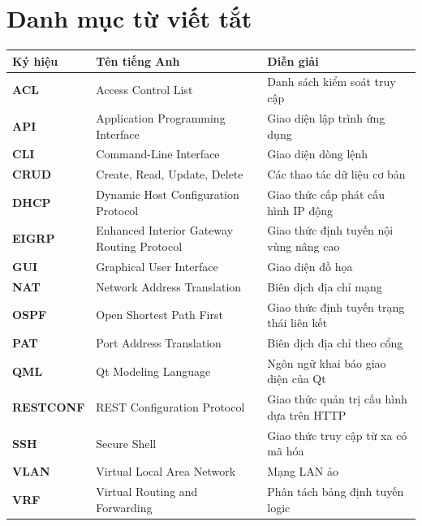 \chapter*{Danh mục từ viết tắt}

\begin{longtable}{>{\bfseries}p{}p{}p{}}
\toprule
Ký hiệu & Tên tiếng Anh & Diễn giải \\
\midrule
ACL & Access Control List & Danh sách kiểm soát truy cập \\
API & Application Programming Interface & Giao diện lập trình ứng dụng \\
CLI & Command-Line Interface & Giao diện dòng lệnh \\
CRUD & Create, Read, Update, Delete & Các thao tác dữ liệu cơ bản \\
DHCP & Dynamic Host Configuration Protocol & Giao thức cấp phát cấu hình IP động \\
EIGRP & Enhanced Interior Gateway Routing Protocol & Giao thức định tuyến nội vùng nâng cao \\
GUI & Graphical User Interface & Giao diện đồ họa \\
NAT & Network Address Translation & Biên dịch địa chỉ mạng \\
OSPF & Open Shortest Path First & Giao thức định tuyến trạng thái liên kết \\
PAT & Port Address Translation & Biên dịch địa chỉ theo cổng \\
QML & Qt Modeling Language & Ngôn ngữ khai báo giao diện của Qt \\
RESTCONF & REST Configuration Protocol & Giao thức quản trị cấu hình dựa trên HTTP \\
SSH & Secure Shell & Giao thức truy cập từ xa có mã hóa \\
VLAN & Virtual Local Area Network & Mạng LAN ảo \\
VRF & Virtual Routing and Forwarding & Phân tách bảng định tuyến logic \\
\bottomrule
\end{longtable}
